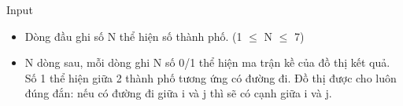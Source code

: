 Input
\begin{itemize}
	\item     Dòng đầu ghi số N thể hiện số thành phố. (1  $\le$  N  $\le$  7)   
\end{itemize}
\begin{itemize}
	\item     N dòng sau, mỗi dòng ghi N số 0/1 thể hiện ma trận kề của đồ thị kết quả. Số 1 thể hiện giữa 2 thành phố tương ứng có đường đi. Đồ thị được cho luôn đúng đắn: nếu có đường đi giữa i và j thì sẽ có cạnh giữa i và j.   
\end{itemize}